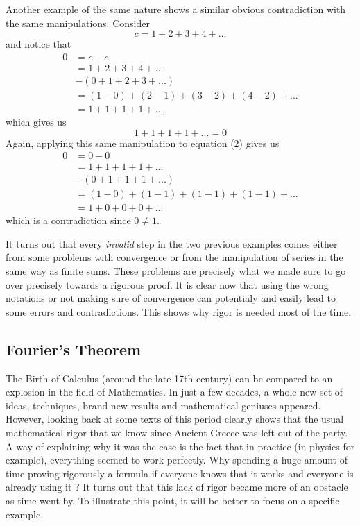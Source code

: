 \documentclass[10pt]{article}
\theoremstyle{definition}
\begin{document}
Another example of the same nature shows a similar obvious contradiction with the same manipulations. Consider
$$c = 1 + 2 + 3 + 4 + ...$$
and notice that
\begin{align*}
    0 &= c-c \\
    &= 1 + 2 + 3 + 4 + ... \\
    & - (0 + 1 + 2 + 3 + ...) \\
    &= (1 - 0) + (2 - 1) + (3 - 2) + (4 - 2) + ... \\
    &= 1 + 1 + 1 + 1 + ...
\end{align*}
which gives us
\[1 + 1 + 1 + 1 + ... = 0 \tag*{(2)}\]
Again, applying this same manipulation to equation (2) gives us 
\begin{align*}
    0 &= 0-0 \\
    &= 1 + 1 + 1 + 1 + ... \\
    & - (0 + 1 + 1 + 1 + ...) \\
    &= (1 - 0) + (1 - 1) + (1 - 1) + (1 - 1) + ... \\
    &= 1 + 0 + 0 + 0 + ...
\end{align*}
which is a contradiction since $0 \neq 1$. 

It turns out that every \textit{invalid} step in the two previous examples comes either from some problems with convergence or from the manipulation of series in the same way as finite sums. These problems are precisely what we made sure to go over precisely towards a rigorous proof. It is clear now that using the wrong notations or not making sure of convergence can potentialy and easily lead to some errors and contradictions. This shows why rigor is needed most of the time.

\subsection{Fourier's Theorem}

The Birth of Calculus (around the late 17th century) can be compared to an explosion in the field of Mathematics. In just a few decades, a whole new set of ideas, techniques, brand new results and mathematical geniuses appeared. However, looking back at some texts of this period clearly shows that the usual mathematical rigor that we know since Ancient Greece was left out of the party. A way of explaining why it was the case is the fact that in practice (in physics for example), everything seemed to work perfectly. Why spending a huge amount of time proving rigorously a formula if everyone knows that it works and everyone is already using it ? It turns out that this lack of rigor became more of an obstacle as time went by. To illustrate this point, it will be better to focus on a specific example.
\end{document}
